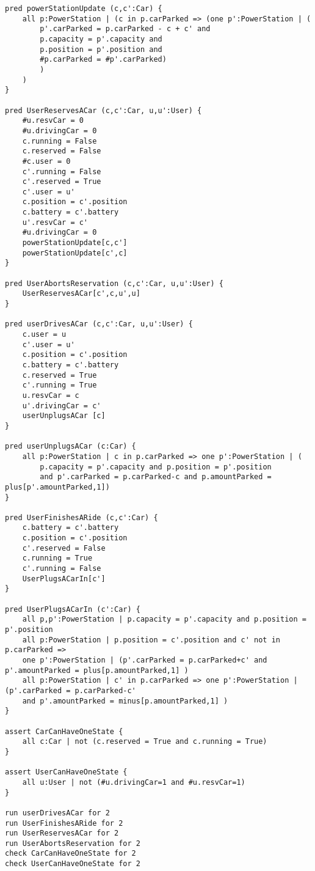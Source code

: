 \begin{verbatim}
pred powerStationUpdate (c,c':Car) {
	all p:PowerStation | (c in p.carParked => (one p':PowerStation | (
		p'.carParked = p.carParked - c + c' and
		p.capacity = p'.capacity and
		p.position = p'.position and
		#p.carParked = #p'.carParked)
		)
	)
}

pred UserReservesACar (c,c':Car, u,u':User) {
	#u.resvCar = 0
	#u.drivingCar = 0
	c.running = False
	c.reserved = False
	#c.user = 0
	c'.running = False
	c'.reserved = True
	c'.user = u'
	c.position = c'.position
	c.battery = c'.battery
	u'.resvCar = c'
	#u.drivingCar = 0
	powerStationUpdate[c,c']
	powerStationUpdate[c',c]
}

pred UserAbortsReservation (c,c':Car, u,u':User) {
	UserReservesACar[c',c,u',u]
}

pred userDrivesACar (c,c':Car, u,u':User) {
	c.user = u
	c'.user = u'
	c.position = c'.position
	c.battery = c'.battery
	c.reserved = True
	c'.running = True
	u.resvCar = c
	u'.drivingCar = c'
	userUnplugsACar [c]
}

pred userUnplugsACar (c:Car) {
	all p:PowerStation | c in p.carParked => one p':PowerStation | (
		p.capacity = p'.capacity and p.position = p'.position 
		and p'.carParked = p.carParked-c and p.amountParked = plus[p'.amountParked,1])
}

pred UserFinishesARide (c,c':Car) {
	c.battery = c'.battery
	c.position = c'.position
	c'.reserved = False
	c.running = True
	c'.running = False
	UserPlugsACarIn[c']
}

pred UserPlugsACarIn (c':Car) {
	all p,p':PowerStation | p.capacity = p'.capacity and p.position = p'.position
	all p:PowerStation | p.position = c'.position and c' not in p.carParked => 
	one p':PowerStation | (p'.carParked = p.carParked+c' and p'.amountParked = plus[p.amountParked,1] )
	all p:PowerStation | c' in p.carParked => one p':PowerStation | (p'.carParked = p.carParked-c'
	and p'.amountParked = minus[p.amountParked,1] )
}

assert CarCanHaveOneState {
	all c:Car | not (c.reserved = True and c.running = True)
}

assert UserCanHaveOneState {
	all u:User | not (#u.drivingCar=1 and #u.resvCar=1)
}

run userDrivesACar for 2 
run UserFinishesARide for 2
run UserReservesACar for 2 
run UserAbortsReservation for 2 
check CarCanHaveOneState for 2
check UserCanHaveOneState for 2
\end{verbatim}